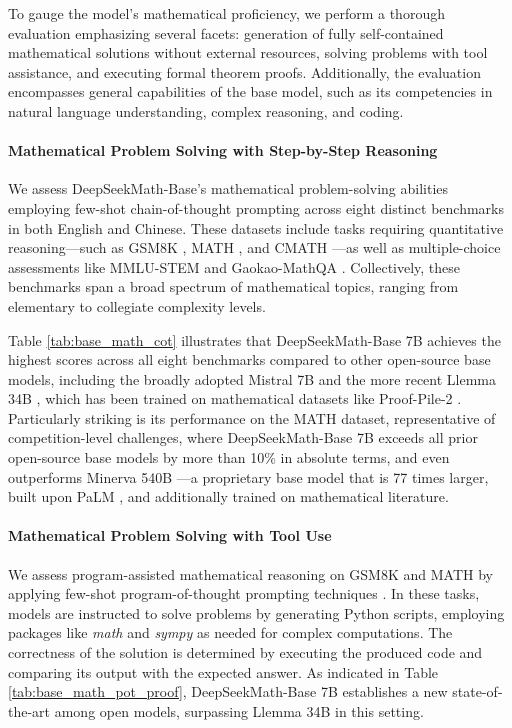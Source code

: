 To gauge the model’s mathematical proficiency, we perform a thorough evaluation emphasizing several facets: generation of fully self-contained mathematical solutions without external resources, solving problems with tool assistance, and executing formal theorem proofs. Additionally, the evaluation encompasses general capabilities of the base model, such as its competencies in natural language understanding, complex reasoning, and coding.

\paragraph{Mathematical Problem Solving with Step-by-Step Reasoning}

We assess DeepSeekMath-Base’s mathematical problem-solving abilities employing few-shot chain-of-thought prompting \citep{cot} across eight distinct benchmarks in both English and Chinese. These datasets include tasks requiring quantitative reasoning—such as GSM8K \citep{gsm8k}, MATH \citep{MATH}, and CMATH \citep{wei2023cmath}—as well as multiple-choice assessments like MMLU-STEM \citep{mmlu} and Gaokao-MathQA \citep{agieval}. Collectively, these benchmarks span a broad spectrum of mathematical topics, ranging from elementary to collegiate complexity levels.

Table \ref{tab:base_math_cot} illustrates that DeepSeekMath-Base 7B achieves the highest scores across all eight benchmarks compared to other open-source base models, including the broadly adopted Mistral 7B \citep{mistral} and the more recent Llemma 34B \citep{llemma}, which has been trained on mathematical datasets like Proof-Pile-2 \citep{llemma}. Particularly striking is its performance on the MATH dataset, representative of competition-level challenges, where DeepSeekMath-Base 7B exceeds all prior open-source base models by more than 10\% in absolute terms, and even outperforms Minerva 540B \citep{minerva}—a proprietary base model that is 77 times larger, built upon PaLM \citep{palm}, and additionally trained on mathematical literature.

\paragraph{Mathematical Problem Solving with Tool Use} We assess program-assisted mathematical reasoning on GSM8K and MATH by applying few-shot program-of-thought prompting techniques \citep{pot,pal}. In these tasks, models are instructed to solve problems by generating Python scripts, employing packages like \textit{math} and \textit{sympy} as needed for complex computations. The correctness of the solution is determined by executing the produced code and comparing its output with the expected answer. As indicated in Table \ref{tab:base_math_pot_proof}, DeepSeekMath-Base 7B establishes a new state-of-the-art among open models, surpassing Llemma 34B in this setting.

